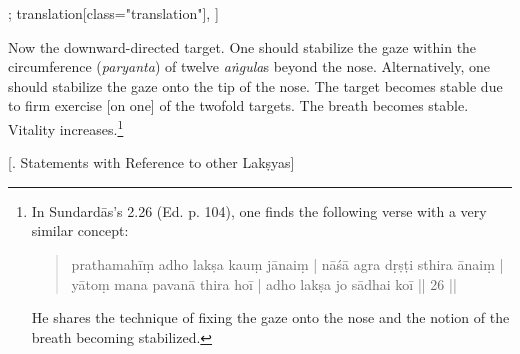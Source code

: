 \begin{alignment}[
  texts=edition[class="edition"];
  translation[class="translation"],
  ]
\begin{translation}
\begin{tlate}
      \noindent
    Now the downward-directed target. One should stabilize the gaze within the circumference (\textit{paryanta}) of twelve \textit{aṅgula}s beyond the nose. Alternatively, one should stabilize the gaze onto the tip of the nose. The target becomes stable due to firm exercise [on one] of the twofold targets. The breath becomes stable.\textsuperscript{\coro{[\lowroman{5}]}} Vitality increases.\footnote{In Sundardās's  2.26 (Ed. p. 104), one finds the following verse with a very similar concept:
      \begin{quote}
        prathamahīṃ adho lakṣa kauṃ jānaiṃ | nāśā agra dṛṣṭi sthira ānaiṃ |\\
yātoṃ mana pavanā thira hoī | adho lakṣa jo sādhai koī || 26 ||
\end{quote}
 He shares the technique of fixing the gaze onto the nose and the notion of the breath becoming stabilized.} 
\end{tlate}
   \bigskip
   \centerline{\textrm{\small{[.\textsuperscript{} Statements with Reference to other Lakṣyas]}}}
   \label{laksyastatementstrans}
    \bigskip
  \begin{tlate}

\end{tlate}
\end{translation}
\end{alignment}
